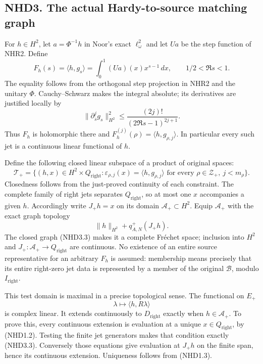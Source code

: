 \subsection{NHD3. The actual Hardy-to-source matching
graph}\label{nhd3.-the-actual-hardy-to-source-matching-graph}

For \(h\in H^2\), let \(a=\Phi^{-1}h\) in Noor's exact \(\ell^2_\omega\)
and let \(Ua\) be the step function of NHR2. Define \[
F_h(s)=\langle h,g_s\rangle
=\int_0^1(Ua)(x)x^{s-1}\,dx,
\qquad 1/2<\Re s<1.
\tag{NHD3.1}
\] The equality follows from the orthogonal step projection in NHR2 and
the unitary \(\Phi\). Cauchy--Schwarz makes the integral absolute; its
derivatives are justified locally by \[
\|\partial_{\bar s}^{j}g_s\|_{H^2}^2
\le\frac{(2j)!}{(2\Re s-1)^{2j+1}}.
\tag{NHD3.2}
\] Thus \(F_h\) is holomorphic there and
\(F_h^{(j)}(\rho)=\langle h,g_{\rho,j}\rangle\). In particular every
such jet is a continuous linear functional of \(h\).

Define the following closed linear subspace of a product of original
spaces: \[
\mathscr T_+=\{(h,x)\in H^2\times Q_{\mathrm{right}}:
\varepsilon_{\rho,j}(x)=\langle h,g_{\rho,j}\rangle
\text{ for every }\rho\in\mathscr Z_+,\ j<m_\rho\}.
\tag{NHD3.3}
\] Closedness follows from the just-proved continuity of each
constraint. The complete family of right jets separates
\(Q_{\mathrm{right}}\), so at most one \(x\) accompanies a given \(h\).
Accordingly write \(J_+h=x\) on its domain \(\mathscr A_+\subset H^2\).
Equip \(\mathscr A_+\) with the exact graph topology \[
\|h\|_{H^2}+q^+_{A,N}(J_+h).
\tag{NHD3.4}
\] The closed graph (NHD3.3) makes it a complete Fréchet space;
inclusion into \(H^2\) and \(J_+:\mathscr A_+\to Q_{\mathrm{right}}\)
are continuous. No existence of an entire source representative for an
arbitrary \(F_h\) is assumed: membership means precisely that its entire
right-zero jet data is represented by a member of the original
\(\mathcal B\), modulo \(I_{\mathrm{right}}\).

This test domain is maximal in a precise topological sense. The
functional on \(E_+\) \[
\lambda\longmapsto\langle h,R\lambda\rangle
\tag{NHD3.5}
\] is complex linear. It extends continuously to \(D_{\mathrm{right}}\)
exactly when \(h\in\mathscr A_+\). To prove this, every continuous
extension is evaluation at a unique \(x\in Q_{\mathrm{right}}\), by
(NHD1.2). Testing the finite jet generators makes that condition exactly
(NHD3.3). Conversely those equations give evaluation at \(J_+h\) on the
finite span, hence its continuous extension. Uniqueness follows from
(NHD1.3).

